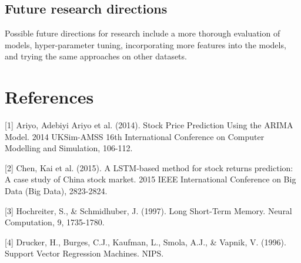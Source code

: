 \documentclass{article}
\begin{document}
\subsection{Future research directions}

Possible future directions for research include a more thorough evaluation of models, hyper-parameter tuning, incorporating more features into the models, and trying the same approaches on other datasets.


\section*{References}

\small

[1] Ariyo, Adebiyi Ariyo et al. (2014). Stock Price Prediction Using the ARIMA Model. 2014 UKSim-AMSS 16th International Conference on Computer Modelling and Simulation, 106-112.

[2] Chen, Kai et al. (2015). A LSTM-based method for stock returns prediction: A case study of China stock market. 2015 IEEE International Conference on Big Data (Big Data), 2823-2824.

[3] Hochreiter, S., \& Schmidhuber, J. (1997). Long Short-Term Memory. Neural Computation, 9, 1735-1780.

[4] Drucker, H., Burges, C.J., Kaufman, L., Smola, A.J., \& Vapnik, V. (1996). Support Vector Regression Machines. NIPS.
\end{document}
